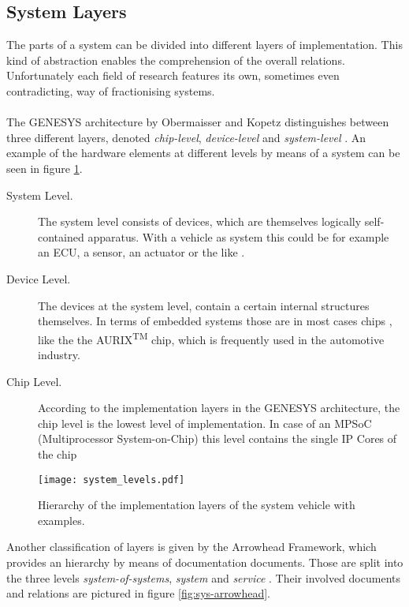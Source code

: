 \subsection{System Layers}
\label{ch:system_layers}
The parts of a system can be divided into different layers of implementation. This kind of abstraction enables the comprehension of the overall relations. Unfortunately each field of research features its own, sometimes even contradicting, way of fractionising systems.
\\
\\
The GENESYS architecture by Obermaisser and Kopetz distinguishes between three different layers, denoted \emph{chip-level}, \emph{device-level} and \emph{system-level} \cite[p.44]{genesys}. An example of the hardware elements at different levels by means of a system can be seen in figure \ref{fig:integration_levels}.

\begin{description}
\item [System Level.]
The system level consists of devices, which are themselves logically self-contained apparatus. With a vehicle as system this could be for example an ECU, a sensor, an actuator or the like \cite[p.45]{genesys}.
\item [Device Level.]
The devices at the system level, contain a certain internal structures themselves. In terms of embedded systems those are in most cases chips \cite[p.45]{genesys}, like the the AURIX\textsuperscript{TM} chip, which is frequently used in the automotive industry.
\item [Chip Level.]
According to the implementation layers in the GENESYS architecture, the chip level is the lowest level of implementation. In case of an MPSoC (Multiprocessor System-on-Chip) this level contains the single IP Cores of the chip \cite[p.46]{genesys}
\end{description}

\begin{figure}[!htbp]
\centering
\texttt{[image: system\_levels.pdf]}
\caption{Hierarchy of the implementation layers of the system vehicle with examples.}
\label{fig:integration_levels}
\end{figure}

Another classification of layers is given by the Arrowhead Framework, which provides an hierarchy by means of documentation documents. Those are split into the three levels \emph{system-of-systems}, \emph{system} and \emph{service} \cite{arrowhead_inpr}. Their involved documents and relations are pictured in figure \ref{fig:sys-arrowhead}.

